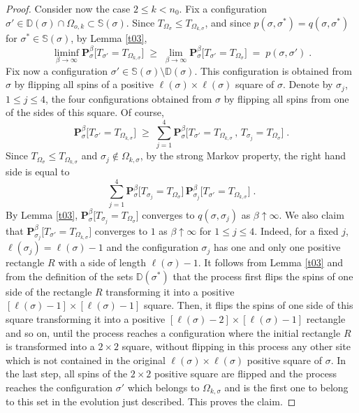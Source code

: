 \documentclass[reqno]{amsart}
\begin{document}
\begin{proof}
Consider now the case $2\le k<n_0$. Fix a configuration $\sigma'\in
{{\mathbb D}}(\sigma) \cap \Omega_{o,k} \subset {{\mathbb S}}(\sigma)$. Since
$T_{\Omega_{\sigma}} \le T_{\Omega_{k,\sigma}}$,  and since $p(\sigma,
\sigma^*) = q(\sigma, \sigma^*)$ for $\sigma^*\in {{\mathbb S}}(\sigma)$, by
Lemma \ref{t03},
\begin{equation*}
\liminf_{\beta\to\infty} {{\mathbf P}}^\beta_\sigma \big[ T_{\sigma'} = 
T_{\Omega_{k, \sigma}} \big] \;\ge\;  
\lim_{\beta\to\infty} {{\mathbf P}}^\beta_\sigma \big[ T_{\sigma'} = 
T_{\Omega_{\sigma}} \big] \;=\; p(\sigma, \sigma')\;.
\end{equation*}
Fix now a configuration $\sigma'\in {{\mathbb S}}(\sigma) \setminus {{\mathbb D}}(\sigma)$. This configuration is obtained from $\sigma$ by flipping
all spins of a positive $\ell(\sigma) \times \ell(\sigma)$ square of
$\sigma$. Denote by $\sigma_j$, $1\le j\le 4$, the four configurations
obtained from $\sigma$ by flipping all spins from one of the sides of
this square. Of course,
\begin{equation*}
{{\mathbf P}}^\beta_\sigma \big[ T_{\sigma'} = T_{\Omega_{k, \sigma}} \big]
\;\ge\; \sum_{j=1}^4 {{\mathbf P}}^\beta_\sigma 
\big[ T_{\sigma'} = T_{\Omega_{k, \sigma}} \,,\, T_{\sigma_j} =
T_{\Omega_{\sigma}} \big]\;.
\end{equation*}
Since $T_{\Omega_{\sigma}} \le T_{\Omega_{k, \sigma}}$ and
$\sigma_j\not\in\Omega_{k, \sigma}$, by the strong Markov property,
the right hand side is equal to
\begin{equation*}
\sum_{j=1}^4 {{\mathbf P}}^\beta_\sigma 
\big[ T_{\sigma_j} = T_{\Omega_{\sigma}} \big] \, {{\mathbf P}}^\beta_{\sigma_j}
\big[ T_{\sigma'} = T_{\Omega_{k, \sigma}} \big] \;.
\end{equation*}
By Lemma \ref{t03}, ${{\mathbf P}}^\beta_\sigma \big[ T_{\sigma_j} =
T_{\Omega_{\sigma}} \big]$ converges to $q(\sigma, \sigma_j)$ as
$\beta\uparrow\infty$. We also claim that ${{\mathbf P}}^\beta_{\sigma_j}
\big[ T_{\sigma'} = T_{\Omega_{k, \sigma}} \big]$ converges to $1$ as
$\beta\uparrow\infty$ for $1\le j\le 4$. Indeed, for a fixed $j$,
$\ell(\sigma_j) = \ell(\sigma)-1$ and the configuration $\sigma_j$ has
one and only one positive rectangle $R$ with a side of length
$\ell(\sigma)-1$. It follows from Lemma \ref{t03} and from the
definition of the sets ${{\mathbb D}}(\sigma^*)$ that the process first flips
the spins of one side of the rectangle $R$ transforming it into a
positive $[\ell(\sigma)-1]\times [\ell(\sigma)-1]$ square. Then, it
flips the spins of one side of this square transforming it into a
positive $[\ell(\sigma)-2]\times [\ell(\sigma)-1]$ rectangle and so
on, until the process reaches a configuration where the initial
rectangle $R$ is transformed into a $2\times 2$ square, without
flipping in this process any other site which is not contained in the
original $\ell(\sigma) \times \ell(\sigma)$ positive square of
$\sigma$. In the last step, all spins of the $2\times 2$ positive
square are flipped and the process reaches the configuration $\sigma'$
which belongs to $\Omega_{k, \sigma}$ and is the first one to belong
to this set in the evolution just described. This proves the claim.


\end{proof}
\end{document}
